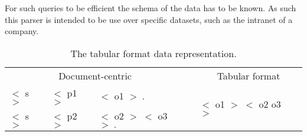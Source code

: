 For such queries to be efficient the schema of the data has to be known. As
such this parser is intended to be use over specific datasets, such as the
intranet of a company.

\begin{table}
\centering
\begin{tabular}{lllc@{\hs}ll}
\toprule
\multicolumn{3}{c}{Document-centric} & \phantom{a} & \multicolumn{2}{c}{Tabular
format} \\
$<$ s $>$ & $<$ p1 $>$ & $<$ o1 $>\;.$ & \phantom{a} &
\multirow{2}{*}{$<$ o1 $> \; <$ o2 \; o3 $>$} \\
$<$ s $>$ & $<$ p2 $>$ & $<$ o2 $> \; <$ o3 $>\;.$ & \phantom{a} & & \\
\bottomrule
\end{tabular}
\caption{The tabular format data representation.}
\label{tab:tabular-format}
\end{table}
